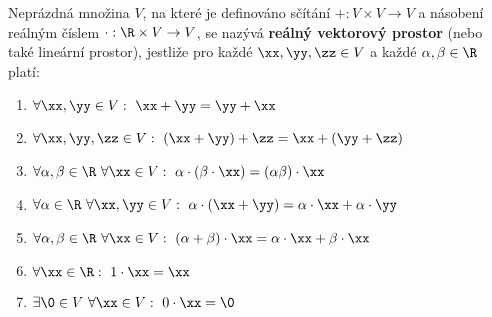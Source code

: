 \begin{df}
\label{df:vekt_prostor}
Neprázdná množina $V$, na které je definováno sčítání $+:V\times V\to V$ a násobení reálným číslem $\cdot:\R\times V\to V$, se nazývá {\bf reálný vektorový prostor} (nebo také lineární prostor), jestliže pro každé $\xx, \yy, \zz\in V$ a každé $\alpha,\beta\in\R$ platí:
\begin{enumerate}
\item $\forall\xx,\yy\in V:~\xx+\yy=\yy+\xx$ 
\item $\forall\xx,\yy,\zz\in V:~(\xx+\yy)+\zz=\xx+(\yy+\zz)$ 
\item $\forall\alpha,\beta\in\R~\forall\xx\in V:~\alpha\cdot(\beta\cdot\xx)=(\alpha\beta)\cdot\xx$ 
\item $\forall\alpha\in\R~\forall\xx,\yy\in V:~\alpha\cdot(\xx+\yy)=\alpha\cdot\xx+\alpha\cdot\yy$ 
\item $\forall\alpha,\beta\in\R~\forall\xx\in V:~(\alpha+\beta)\cdot\xx=\alpha\cdot\xx+\beta\cdot\xx$ 
\item $\forall\xx\in\R:~1\cdot\xx=\xx$ 
\item $\exists\0\in V ~\forall\xx\in V:~0\cdot\xx=\0$ 
\end{enumerate}
\end{df}

